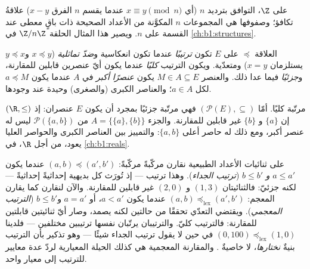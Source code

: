 \begin{example}\label{ex:b1:logic:congruence}
على $\Z$، التوافق بترديد $n$ (أي $x \equiv y \pmod n$ عندما يقسم $n$
الفرق $x - y$) علاقةُ تكافؤ؛ وصفوفها هي المجموعات $n$ المكوَّنة من
الأعداد الصحيحة ذات باقٍ معطى عند القسمة على $n$. ويصير هذا المثال
الحلقة $\Z/n\Z$ في \cref{ch:b1:structures}.
\end{example}

\begin{definition}\label{def:b1:logic:order}
العلاقة $\preceq$ على $E$ تكون \emph{ترتيبًا}
عندما تكون انعكاسية و\emph{ضدّ تماثلية} ($x \preceq y$ و$y
\preceq x$ يستلزمان $x = y$) ومتعدّية. ويكون الترتيب \emph{كليًا}
عندما يكون أيّ عنصرين قابلين للمقارنة، و\emph{جزئيًا} فيما عدا ذلك.
والعنصر $M \in A \subseteq E$ يكون \emph{عنصرًا أكبر} في $A$ عندما
يكون $a \preceq M$ لكل $a \in A$؛ والعناصر الكبرى (والصغرى) وحيدة
عند وجودها.
\end{definition}

\begin{example}\label{ex:b1:logic:orders}
 $(\R, \leq)$ مرتّبة  كليًا. أمّا $(\mathcal{P}(E), \subseteq)$ فهي
مرتّبة  جزئيًا بمجرد أن يكون  $E$ عنصران: إذ إن $\{a\}$
و $\{b\}$ غير قابلين للمقارنة. والجزء $A = \{\{a\}, \{b\}\}$ من
$\mathcal{P}(\{a,b\})$ ليس له عنصر أكبر، ومع ذلك له حاصر أعلى
$\{a, b\}$: والتمييز بين العناصر الكبرى والحواصر العليا يعود، من
أجل $\R$، في \cref{ch:b1:reals}.
\end{example}

\begin{example}\label{ex:b1:logic:lexorder}
على ثنائيات الأعداد الطبيعية نقارن مركّبةً مركّبةً: $(a, b) \preceq (a',
b')$ عندما يكون $a \leq a'$ \emph{و} $b \leq b'$ (\emph{ترتيب
الجداء}). وهذا ترتيب --- إذ تُورَث كل بديهية إحداثيةً إحداثيةً
--- لكنه جزئيّ: فالثنائيتان $(1, 3)$ و $(2, 0)$ غير قابلين للمقارنة.
والآن لنقارن كما يقارن المعجم: $(a, b)
\preceq_{\mathrm{lex}} (a', b')$ عندما يكون $a < a'$، أو $a = a'$ و$b
\leq b'$ (\emph{الترتيب المعجمي}). ويقتضي التعدّي تحققًا من
حالتين لكنه يصمد، وصار أيّ ثنائيتين قابلتين للمقارنة: فالترتيب
كليّ. والترتيبان يرتّبان  نفسها ترتيبين مختلفين --- فلدينا $(0, 100) \preceq_{\mathrm{lex}} (1, 0)$ في حين لا يقول ترتيب
الجداء شيئًا --- وهو تذكير بأن الترتيب بنيةٌ \emph{نختارها}، لا
خاصيةٌ . والمقارنة المعجمية هي كذلك الحيلة المعيارية
لردّ عدة معايير للترتيب إلى معيار واحد.
\end{example}

